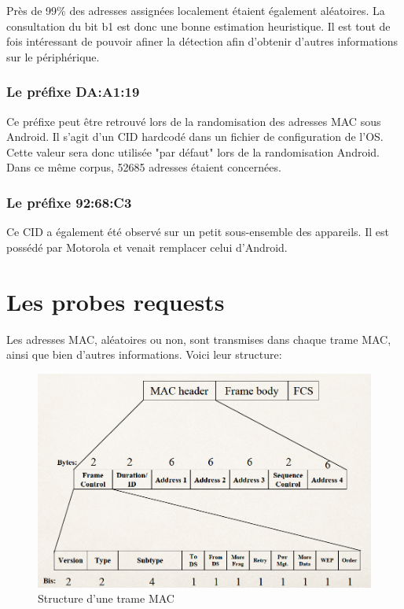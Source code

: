 Près de 99\% des adresses assignées localement étaient également aléatoires. La consultation
du bit b1 est donc une bonne estimation heuristique. Il est tout de fois intéressant de pouvoir afiner
la détection afin d'obtenir d'autres informations sur le périphérique. 

\subsubsection{Le préfixe DA:A1:19}
Ce préfixe peut être retrouvé lors de la randomisation des adresses MAC sous Android.
Il s'agit d'un CID hardcodé dans un fichier de configuration de l'OS. Cette valeur sera donc utilisée "par défaut"
lors de la randomisation Android. Dans ce même corpus, 52685 adresses étaient concernées.

\subsubsection{Le préfixe 92:68:C3}
Ce CID a également été observé sur un petit sous-ensemble des appareils. Il est possédé par Motorola et venait remplacer
celui d'Android.

\section{Les probes requests}

Les adresses MAC, aléatoires ou non, sont transmises dans chaque trame MAC, ainsi que bien d'autres
informations. Voici leur structure:

\begin{figure}[H]
	\centering
	\includegraphics[width=14cm]{images/probe/mac_frame.png}
	\caption{Structure d'une trame MAC}
	\label{fig:macframe}
\end{figure}

